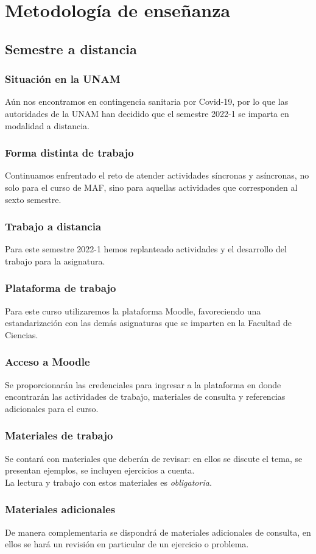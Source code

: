 \section{Metodología de enseñanza}
\subsection{Semestre a distancia}
\begin{frame}
\frametitle{Situación en la UNAM}
Aún nos encontramos en contingencia sanitaria por Covid-19, por lo que las autoridades de la UNAM han decidido que el semestre 2022-1 se imparta en modalidad a distancia.
\end{frame}
\begin{frame}
\frametitle{Forma distinta de trabajo}
Continuamos enfrentado el reto de atender actividades síncronas y asíncronas, no solo para el curso de MAF, sino para aquellas actividades que corresponden al sexto semestre.
\end{frame}
\begin{frame}
\frametitle{Trabajo a distancia}
Para este semestre 2022-1 hemos replanteado actividades y el desarrollo del trabajo para la asignatura.
\end{frame}
\begin{frame}
\frametitle{Plataforma de trabajo}
Para este curso utilizaremos la plataforma Moodle, favoreciendo una estandarización con las demás asignaturas que se imparten en la Facultad de Ciencias.
\end{frame}
\begin{frame}
\frametitle{Acceso a Moodle}
Se proporcionarán las credenciales para ingresar a la plataforma en donde encontrarán las actividades de trabajo, materiales de consulta y referencias adicionales para el curso.
\end{frame}
\begin{frame}
\frametitle{Materiales de trabajo}
Se contará con materiales que deberán de revisar: en ellos se discute el tema, se presentan ejemplos, se incluyen ejercicios a cuenta.
\\
\bigskip
La lectura y trabajo con estos materiales es \emph{obligatoria.}
\end{frame}
\begin{frame}
\frametitle{Materiales adicionales}
De manera complementaria se dispondrá de materiales adicionales de consulta, en ellos se hará un revisión en particular de un ejercicio o problema.
\end{frame}
